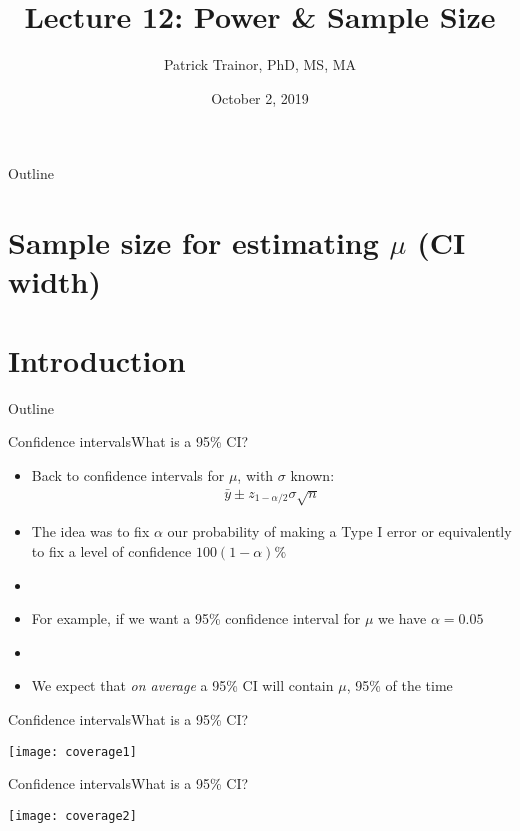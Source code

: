 \documentclass[xcolor=dvipsnames]{beamer}
\title[Lecture 12]{Lecture 12: Power \& Sample Size}
\author[Patrick Trainor]{Patrick Trainor, PhD, MS, MA}
\institute[NMSU]{New Mexico State University}
\date{October 2, 2019}
\begin{document}
\begin{frame}
\maketitle
\end{frame}

\begin{frame}{Outline}
\tableofcontents[hideallsubsections]
\end{frame}

\section{Sample size for estimating $\mu$ (CI width)}
\section{Introduction}
\begin{frame}{Outline}
\tableofcontents[currentsection,subsectionstyle=show/shaded/hide]
\end{frame}

\begin{frame}{Confidence intervals}{What is a 95\% CI?}
\begin{itemize}
	\item Back to confidence intervals for $\mu$, with $\sigma$ known:
	\begin{gather*}
		\bar{y}\pm z_{1-\alpha/2} \sigma \sqrt{n}
	\end{gather*}
	\item The idea was to fix $\alpha$ our probability of making a Type I error or equivalently to fix a level of confidence $100(1-\alpha)\%$
	\item[]
	\item For example, if we want a 95\% confidence interval for $\mu$ we have $\alpha = 0.05$
	\item[]
	\item We expect that \emph{on average} a 95\% CI will contain $\mu$,  95\% of the time
\end{itemize}
\end{frame}

\begin{frame}{Confidence intervals}{What is a 95\% CI?}
	\begin{center}
		\texttt{[image: coverage1]}
	\end{center}
\end{frame}

\begin{frame}{Confidence intervals}{What is a 95\% CI?}
\begin{center}
	\texttt{[image: coverage2]}
\end{center}
\end{frame}
\end{document}
